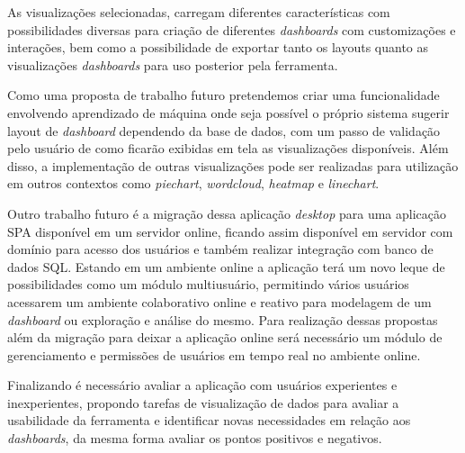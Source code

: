 \documentclass[
	12pt,				%
	openright,			%
	oneside,			%
	a4paper,			%
	english,			%
	brazil				%
	]{abntex2}
\begin{document}
As visualizações selecionadas, carregam diferentes características com possibilidades diversas para criação de diferentes \textit{dashboards} com customizações e interações, bem como a possibilidade de exportar tanto os layouts quanto as visualizações \textit{dashboards} para uso posterior pela ferramenta.

Como uma proposta de trabalho futuro pretendemos criar uma funcionalidade envolvendo aprendizado de máquina onde seja possível o próprio sistema sugerir layout de \textit{dashboard} dependendo da base de dados, com um passo de validação pelo usuário de como ficarão exibidas em tela as visualizações disponíveis. Além disso, a implementação de outras visualizações pode ser realizadas para utilização em outros contextos como \textit{piechart}, \textit{wordcloud}, \textit{heatmap} e \textit{linechart}.

Outro trabalho futuro é a migração dessa aplicação \textit{desktop} para uma aplicação SPA disponível em um servidor online, ficando assim disponível em servidor com domínio para acesso dos usuários e também realizar integração com banco de dados SQL. Estando em um ambiente online a aplicação terá um novo leque de possibilidades como um módulo multiusuário, permitindo vários usuários acessarem um ambiente colaborativo online e reativo para modelagem de um \textit{dashboard} ou exploração e análise do mesmo. Para realização dessas propostas além da migração para deixar a aplicação online será necessário um módulo de gerenciamento e permissões de usuários em tempo real no ambiente online.

Finalizando é necessário avaliar a aplicação com usuários experientes e inexperientes, propondo tarefas de visualização de dados para avaliar a usabilidade da ferramenta e identificar novas necessidades em relação aos \textit{dashboards}, da mesma forma avaliar os pontos positivos e negativos.









\end{document}
